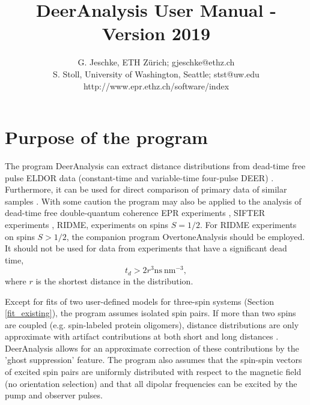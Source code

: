 \documentclass{article}
\begin{document}
\title{DeerAnalysis User Manual - Version 2019}

\author{G. Jeschke, ETH Z\"urich; gjeschke@ethz.ch \\ S. Stoll, University of Washington, Seattle; stst@uw.edu \\ http://www.epr.ethz.ch/software/index}


\maketitle 

\section{Purpose of the program}
\label{purpose}

The program DeerAnalysis can extract distance distributions from dead-time free pulse ELDOR data (constant-time and variable-time four-pulse DEER) \cite{pannier2000,jeschke2004b}. Furthermore, it can be used for direct comparison of primary data of similar samples \cite{jeschke2004a}. With some caution \cite{jeschke2001} the program may also be applied to the analysis of dead-time free double-quantum coherence EPR experiments \cite{borbat1999}, SIFTER experiments \cite{jeschke2000}, RIDME, \cite{kulik2001,milikisyants2009} experiments on spins $S = 1/2$. For RIDME experiments on spins $S > 1/2$, the companion program OvertoneAnalysis \cite{keller2017} should be employed. It should not be used for data from experiments that have a significant dead time,
%
\begin{equation}
	t_{d}> 2 r^{3} \mathrm{ns} \ \mathrm{nm}^{-3} ,
\end{equation}
where $r$ is the shortest distance in the distribution.

Except for fits of two user-defined models for three-spin systems (Section \ref{fit_existing}), the program assumes isolated spin pairs. If more than two spins are coupled (e.g. spin-labeled protein oligomers), distance distributions are only approximate with artifact contributions at both short and long distances \cite{jeschke2009}. DeerAnalysis allows for an approximate correction of these contributions by the 'ghost suppression' feature. The program also assumes that the spin-spin vectors of excited spin pairs are uniformly distributed with respect to the magnetic field (no orientation selection) and that all dipolar frequencies can be excited by the pump and observer pulses.
\end{document}
